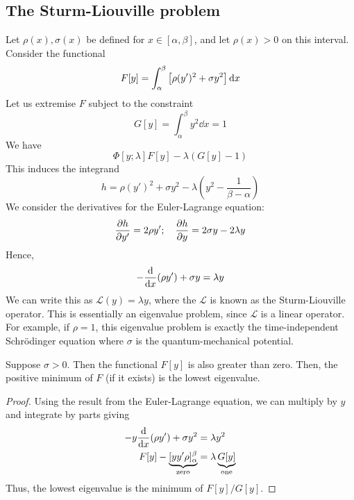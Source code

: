 \subsection{The Sturm-Liouville problem}
Let \( \rho(x), \sigma(x) \) be defined for \( x \in [\alpha, \beta] \), and let \( \rho(x) > 0 \) on this interval.
Consider the functional
\[
	F[y] = \int_\alpha^\beta \qty[ \rho (y')^2 + \sigma y^2 ]\dd{x}
\]
Let us extremise \( F \) subject to the constraint
\[
	G[y] = \int_\alpha^\beta y^2 \dd{x} = 1
\]
We have
\[
	\Phi[y;\lambda]  F[y] - \lambda (G[y] - 1)
\]
This induces the integrand
\[
	h = \rho (y')^2 + \sigma y^2 - \lambda (y^2 - \frac{1}{\beta - \alpha})
\]
We consider the derivatives for the Euler-Lagrange equation:
\[
	\pdv{h}{y'} = 2 \rho y';\quad \pdv{h}{y} = 2 \sigma y - 2 \lambda y
\]
Hence,
\[
	-\dv{x}\qty(\rho y') + \sigma y = \lambda y
\]
We can write this as \( \mathcal L(y) = \lambda y \), where the \( \mathcal L \) is known as the Sturm-Liouville operator.
This is essentially an eigenvalue problem, since \( \mathcal L \) is a linear operator.
For example, if \( \rho = 1 \), this eigenvalue problem is exactly the time-independent Schr\"odinger equation where \( \sigma \) is the quantum-mechanical potential.

Suppose \( \sigma > 0 \).
Then the functional \( F[y] \) is also greater than zero.
Then, the positive minimum of \( F \) (if it exists) is the lowest eigenvalue.
\begin{proof}
	Using the result from the Euler-Lagrange equation, we can multiply by \( y \) and integrate by parts giving
	\begin{align*}
		-y\dv{x}\qty(\rho y') + \sigma y^2                         & = \lambda y^2                            \\
		F[y] - \underbrace{[y y' \rho]_\alpha^\beta}_{\text{zero}} & = \lambda \underbrace{G[y]}_{\text{one}}
	\end{align*}
	Thus, the lowest eigenvalue is the minimum of \( F[y] / G[y] \).
\end{proof}

